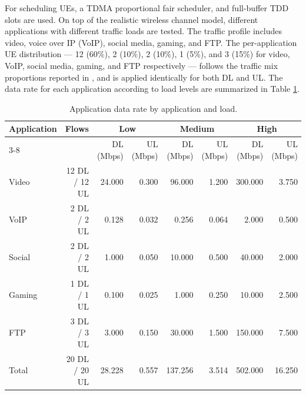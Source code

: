 For scheduling UEs, a TDMA proportional fair scheduler, and full-buffer TDD slots are used.
On top of the realistic wireless channel model, different applications with different traffic loads are tested.
The traffic profile includes video, voice over IP (VoIP), social media, gaming, and FTP.
The per-application UE distribution — 12 (60\%), 2 (10\%), 2 (10\%), 1 (5\%), and 3 (15\%) for video, VoIP, social media, gaming, and FTP respectively — follows the traffic mix proportions reported in \cite{ericsson_mobility}, and is applied identically for both DL and UL.
The data rate for each application according to load levels are summarized in Table \ref{tab:exp2-offered-load}.

\begin{table}[t]
    \centering
    \caption{Application data rate by application and load.}
    \label{tab:exp2-offered-load}
    \begin{tabular}{lrrrrrrr}
        \hline
        Application                & Flows                    & \multicolumn{2}{c}{Low} &
        \multicolumn{2}{c}{Medium} & \multicolumn{2}{c}{High}                                                                                       \\
        \cline{3-8}
                                   &                          & DL (Mbps)               & UL (Mbps) & DL (Mbps) & UL (Mbps) & DL (Mbps) & UL (Mbps) \\
        \hline
        Video                      & 12 DL / 12 UL            & 24.000                  & 0.300     & 96.000    & 1.200     & 300.000   & 3.750     \\
        VoIP                       & 2 DL / 2 UL              & 0.128                   & 0.032     & 0.256     & 0.064     & 2.000     & 0.500     \\
        Social                     & 2 DL / 2 UL              & 1.000                   & 0.050     & 10.000    & 0.500     & 40.000    & 2.000     \\
        Gaming                     & 1 DL / 1 UL              & 0.100                   & 0.025     & 1.000     & 0.250     & 10.000    & 2.500     \\
        FTP                        & 3 DL / 3 UL              & 3.000                   & 0.150     & 30.000    & 1.500     & 150.000   & 7.500     \\
        \hline
        Total                      & 20 DL / 20 UL            & 28.228                  & 0.557     & 137.256   & 3.514     & 502.000   & 16.250    \\
        \hline
    \end{tabular}
\end{table}
